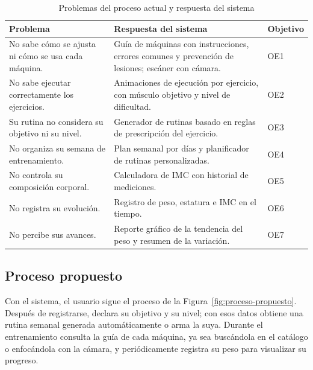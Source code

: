 \begin{table}[H]
\centering
\caption{Problemas del proceso actual y respuesta del sistema}
\label{tab:problemas-proceso}
\begin{tabularx}{\textwidth}{|Y|Y|C{1.9cm}|}
\hline
{} \textbf{Problema} & \textbf{Respuesta del sistema} & \textbf{Objetivo} \\
\hline
No sabe cómo se ajusta ni cómo se usa cada máquina. & Guía de máquinas con
instrucciones, errores comunes y prevención de lesiones; escáner con
cámara. & OE1 \\ \hline
No sabe ejecutar correctamente los ejercicios. & Animaciones de ejecución por
ejercicio, con músculo objetivo y nivel de dificultad. & OE2 \\ \hline
Su rutina no considera su objetivo ni su nivel. & Generador de rutinas basado
en reglas de prescripción del ejercicio. & OE3 \\ \hline
No organiza su semana de entrenamiento. & Plan semanal por días y
planificador de rutinas personalizadas. & OE4 \\ \hline
No controla su composición corporal. & Calculadora de IMC con historial de
mediciones. & OE5 \\ \hline
No registra su evolución. & Registro de peso, estatura e IMC en el tiempo. &
OE6 \\ \hline
No percibe sus avances. & Reporte gráfico de la tendencia del peso y
resumen de la variación. & OE7 \\
\hline
\end{tabularx}
\end{table}

\subsection{Proceso propuesto}

Con el sistema, el usuario sigue el proceso de la
Figura~\ref{fig:proceso-propuesto}. Después de registrarse, declara su
objetivo y su nivel; con esos datos obtiene una rutina semanal generada
automáticamente o arma la suya. Durante el entrenamiento consulta la guía de
cada máquina, ya sea buscándola en el catálogo o enfocándola con la cámara, y
periódicamente registra su peso para visualizar su progreso.

